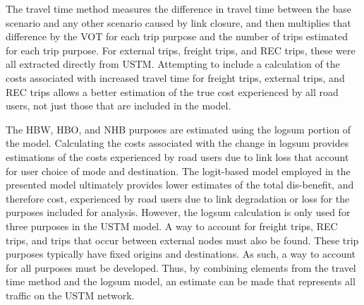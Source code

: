 The travel time method measures the difference in travel time between the base
scenario and any other scenario caused by link closure, and then multiplies that
difference by the VOT for each trip purpose and the number of trips estimated for
each trip purpose. For external trips, freight trips, and REC trips, these were all
extracted directly from USTM. Attempting to include a calculation of the costs
associated with increased travel time for freight trips, external trips, and REC
trips allows a better estimation of the true cost experienced by all road users, not
just those that are included in the model.

The HBW, HBO, and NHB purposes are estimated using the logsum portion of the
model. Calculating the costs associated with the change in logsum
provides estimations of the costs experienced by road users due to link loss
that account for user choice of mode and destination. The logit-based model
employed in the presented model ultimately provides lower estimates of the
total dis-benefit, and therefore cost, experienced by road users due to link
degradation or loss for the purposes included for analysis. However, the
logsum calculation is only used for three purposes in the USTM model. A way to
account for freight trips, REC trips, and trips that occur between external
nodes must also be found. These trip purposes typically have fixed origins
and destinations. As such, a way to account for all purposes must be developed.
Thus, by combining elements from the travel time method and the logsum model,
an estimate can be made that represents all traffic on the USTM network.


